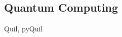 \documentclass[../Resume.tex]{subfiles}
\begin{document}
	\subsection{Quantum Computing}
		Quil, pyQuil
	\vspace*{-2mm}
\end{document}
